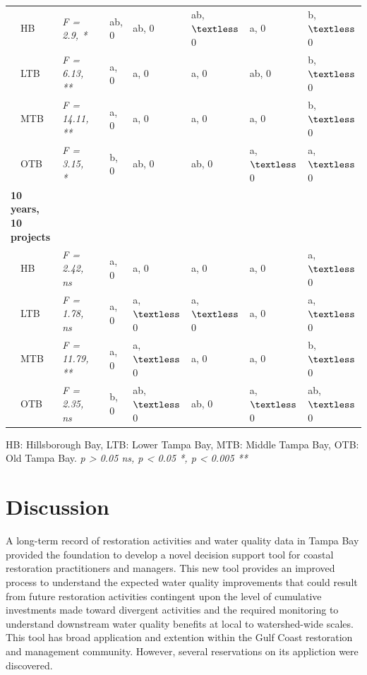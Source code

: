 \documentclass[]{article}
\begin{document}
\begin{table}[!tbp]
\begin{center}
\begin{tabular}{llclllll}
~~HB&\textit{F = 2.9, *}&&ab, 0&ab, 0&ab, $\textless $ 0&a, 0&b, $\textless $ 0\tabularnewline
~~LTB&\textit{F = 6.13, **}&&a, 0&a, 0&a, 0&ab, 0&b, $\textless $ 0\tabularnewline
~~MTB&\textit{F = 14.11, **}&&a, 0&a, 0&a, 0&a, 0&b, $\textless $ 0\tabularnewline
~~OTB&\textit{F = 3.15, *}&&b, 0&ab, 0&ab, 0&a, $\textless $ 0&a, $\textless $ 0\tabularnewline
\hline
{\bfseries 10 years, 10 projects}&&&&&&&\tabularnewline
~~HB&\textit{F = 2.42, ns}&&a, 0&a, 0&a, 0&a, 0&a, $\textless $ 0\tabularnewline
~~LTB&\textit{F = 1.78, ns}&&a, 0&a, $\textless $ 0&a, $\textless $ 0&a, 0&a, $\textless $ 0\tabularnewline
~~MTB&\textit{F = 11.79, **}&&a, 0&a, $\textless $ 0&a, 0&a, 0&b, $\textless $ 0\tabularnewline
~~OTB&\textit{F = 2.35, ns}&&b, 0&ab, $\textless $ 0&ab, 0&a, $\textless $ 0&ab, $\textless $ 0\tabularnewline
\hline
\end{tabular}\end{center}
\footnotesize HB: Hillsborough Bay, LTB: Lower Tampa Bay, MTB: Middle Tampa Bay, OTB: Old Tampa Bay. \textit{p > 0.05 ns, p < 0.05 *, p < 0.005 **}\end{table}

\hypertarget{discussion}{%
\section{Discussion}\label{discussion}}

A long-term record of restoration activities and water quality data in
Tampa Bay provided the foundation to develop a novel decision support
tool for coastal restoration practitioners and managers. This new tool
provides an improved process to understand the expected water quality
improvements that could result from future restoration activities
contingent upon the level of cumulative investments made toward
divergent activities and the required monitoring to understand
downstream water quality benefits at local to watershed-wide scales.
This tool has broad application and extention within the Gulf Coast
restoration and management community. However, several reservations on
its appliction were discovered.
\end{document}
